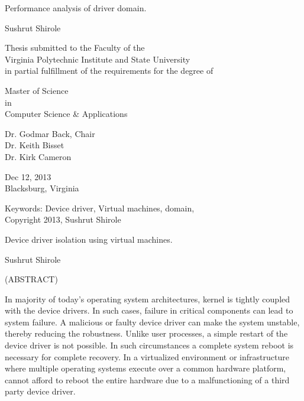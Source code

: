 \documentclass[12pt,dvips]{report}
\begin{document}
\thispagestyle{empty}
\begin{center}

{\Large 
Performance analysis of driver domain.
}

\vfill

Sushrut Shirole

\vfill

Thesis submitted to the Faculty of the \\
Virginia Polytechnic Institute and State University \\
in partial fulfillment of the requirements for the degree of

\vfill

Master of Science \\
in \\
Computer Science \& Applications

\vfill

Dr. Godmar Back, Chair \\
Dr. Keith Bisset \\
Dr. Kirk Cameron\\


\vfill

Dec 12, 2013 \\
Blacksburg, Virginia

\vfill

Keywords: Device driver, Virtual machines, domain,  
\\
Copyright 2013, Sushrut Shirole

\end{center}

\pagebreak

\thispagestyle{empty}
\begin{center}

{\large 
Device driver isolation using virtual machines.
}

\vfill

Sushrut Shirole

\vfill

(ABSTRACT)
\end{center}

In majority of today's operating system architectures, kernel is tightly coupled with the device drivers. In such cases, failure in critical components can lead to system failure.
A malicious or faulty device driver can make the system unstable, thereby reducing the robustness. Unlike user processes, a simple restart of the device driver is not possible. In such circumstances a complete system reboot is necessary for complete recovery. In a virtualized environment or infrastructure where multiple operating systems execute over a common hardware platform, cannot afford to reboot the entire hardware due to a malfunctioning of a third party device driver. 
 
\end{document}

